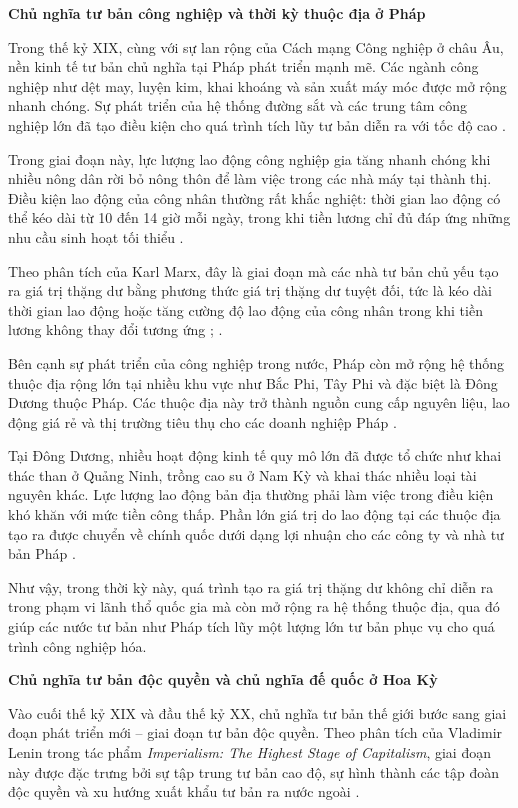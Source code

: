 \textbf{Chủ nghĩa tư bản công nghiệp và thời kỳ thuộc địa ở Pháp}

Trong thế kỷ XIX, cùng với sự lan rộng của Cách mạng Công nghiệp ở châu Âu, nền kinh tế tư bản chủ nghĩa tại Pháp phát triển mạnh mẽ. Các ngành công nghiệp như dệt may, luyện kim, khai khoáng và sản xuất máy móc được mở rộng nhanh chóng. Sự phát triển của hệ thống đường sắt và các trung tâm công nghiệp lớn đã tạo điều kiện cho quá trình tích lũy tư bản diễn ra với tốc độ cao \cite{lichsu}.

Trong giai đoạn này, lực lượng lao động công nghiệp gia tăng nhanh chóng khi nhiều nông dân rời bỏ nông thôn để làm việc trong các nhà máy tại thành thị. Điều kiện lao động của công nhân thường rất khắc nghiệt: thời gian lao động có thể kéo dài từ 10 đến 14 giờ mỗi ngày, trong khi tiền lương chỉ đủ đáp ứng những nhu cầu sinh hoạt tối thiểu \cite{lichsu}.

Theo phân tích của Karl Marx, đây là giai đoạn mà các nhà tư bản chủ yếu tạo ra giá trị thặng dư bằng phương thức giá trị thặng dư tuyệt đối, tức là kéo dài thời gian lao động hoặc tăng cường độ lao động của công nhân trong khi tiền lương không thay đổi tương ứng \cite{gt}; \cite{Capital}.

Bên cạnh sự phát triển của công nghiệp trong nước, Pháp còn mở rộng hệ thống thuộc địa rộng lớn tại nhiều khu vực như Bắc Phi, Tây Phi và đặc biệt là Đông Dương thuộc Pháp. Các thuộc địa này trở thành nguồn cung cấp nguyên liệu, lao động giá rẻ và thị trường tiêu thụ cho các doanh nghiệp Pháp \cite{lichsu}.

Tại Đông Dương, nhiều hoạt động kinh tế quy mô lớn đã được tổ chức như khai thác than ở Quảng Ninh, trồng cao su ở Nam Kỳ và khai thác nhiều loại tài nguyên khác. Lực lượng lao động bản địa thường phải làm việc trong điều kiện khó khăn với mức tiền công thấp. Phần lớn giá trị do lao động tại các thuộc địa tạo ra được chuyển về chính quốc dưới dạng lợi nhuận cho các công ty và nhà tư bản Pháp \cite{lichsu}.

Như vậy, trong thời kỳ này, quá trình tạo ra giá trị thặng dư không chỉ diễn ra trong phạm vi lãnh thổ quốc gia mà còn mở rộng ra hệ thống thuộc địa, qua đó giúp các nước tư bản như Pháp tích lũy một lượng lớn tư bản phục vụ cho quá trình công nghiệp hóa.

\textbf{Chủ nghĩa tư bản độc quyền và chủ nghĩa đế quốc ở Hoa Kỳ}

Vào cuối thế kỷ XIX và đầu thế kỷ XX, chủ nghĩa tư bản thế giới bước sang giai đoạn phát triển mới – giai đoạn tư bản độc quyền. Theo phân tích của Vladimir Lenin trong tác phẩm \textit{Imperialism: The Highest Stage of Capitalism}, giai đoạn này được đặc trưng bởi sự tập trung tư bản cao độ, sự hình thành các tập đoàn độc quyền và xu hướng xuất khẩu tư bản ra nước ngoài \cite{LeninImperial}.

